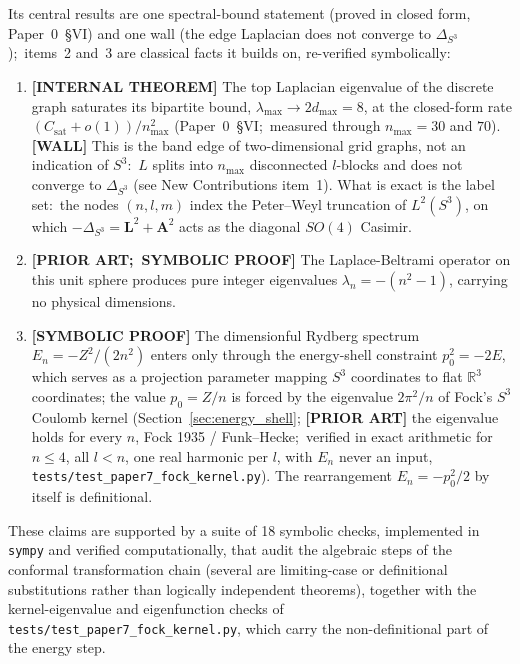 \documentclass[aps,pra,twocolumn,superscriptaddress,longbibliography]{revtex4-2}
\begin{document}
Its central results are one spectral-bound statement (proved in closed form, Paper~0~\S VI) and one wall (the edge Laplacian does not converge to $\Delta_{S^3}$);\ items~2 and~3 are classical facts it builds on, re-verified symbolically:
\begin{enumerate}
\item \textbf{[INTERNAL THEOREM]} The top Laplacian eigenvalue of the discrete graph saturates its bipartite bound, $\lambda_{\max} \to 2 d_{\max} = 8$, at the closed-form rate $(C_{\mathrm{sat}} + o(1))/n_{\max}^2$ (Paper~0~\S VI;\ measured through $n_{\max} = 30$ and $70$).  \textbf{[WALL]} This is the band edge of two-dimensional grid graphs, not an indication of $S^3$:\ $L$ splits into $n_{\max}$ disconnected $l$-blocks and does not converge to $\Delta_{S^3}$ (see New Contributions item~1).  What is exact is the label set:\ the nodes $(n,l,m)$ index the Peter--Weyl truncation of $L^2(S^3)$, on which $-\Delta_{S^3} = \mathbf{L}^2 + \mathbf{A}^2$ acts as the diagonal $SO(4)$ Casimir.
\item \textbf{[PRIOR ART;\ SYMBOLIC PROOF]} The Laplace-Beltrami operator on this unit sphere produces pure integer eigenvalues $\lambda_n = -(n^2 - 1)$, carrying no physical dimensions.
\item \textbf{[SYMBOLIC PROOF]} The dimensionful Rydberg spectrum $E_n = -Z^2/(2n^2)$ enters only through the energy-shell constraint $p_0^2 = -2E$, which serves as a projection parameter mapping $S^3$ coordinates to flat $\mathbb{R}^3$ coordinates; the value $p_0 = Z/n$ is forced by the eigenvalue $2\pi^2/n$ of Fock's $S^3$ Coulomb kernel (Section~\ref{sec:energy_shell}; \textbf{[PRIOR ART]} the eigenvalue holds for every $n$, Fock 1935 / Funk--Hecke;\ verified in exact arithmetic for $n \le 4$, all $l < n$, one real harmonic per $l$, with $E_n$ never an input, \texttt{tests/test\_paper7\_fock\_kernel.py}).  The rearrangement $E_n = -p_0^2/2$ by itself is definitional.
\end{enumerate}

These claims are supported by a suite of 18 symbolic checks, implemented in \texttt{sympy} and verified computationally, that audit the algebraic steps of the conformal transformation chain (several are limiting-case or definitional substitutions rather than logically independent theorems), together with the kernel-eigenvalue and eigenfunction checks of \texttt{tests/test\_paper7\_fock\_kernel.py}, which carry the non-definitional part of the energy step.
\end{document}
